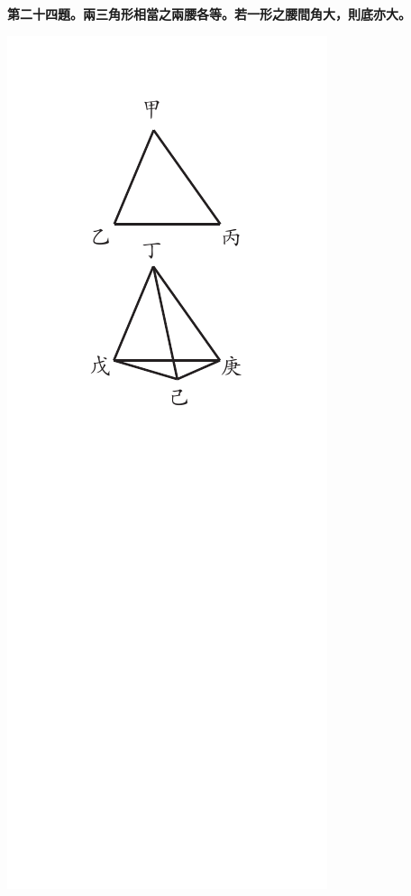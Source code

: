 \documentclass[12pt,b5paper,landscape]{article}
\newcommand{\cthm}[1]{{
\vspace{8pt}

\bfseries #1}}
\begin{document}
\begin{multicols}{2}
\cthm{第二十四題。兩三角形相當之兩腰各等。若一形之腰間角大，則底亦大。}
\begin{center}
    \includegraphics[angle=90]{eu70a}


\end{center}
\end{multicols}
\end{document}
